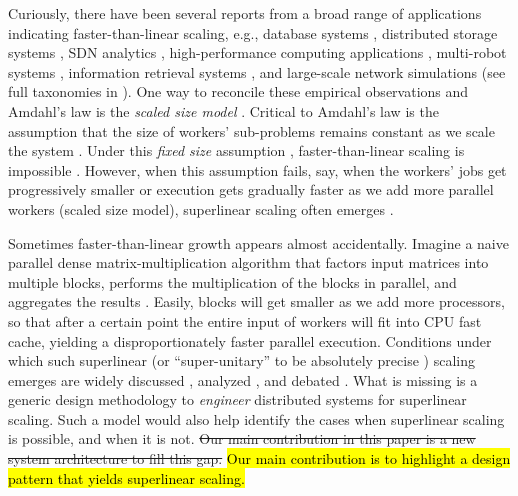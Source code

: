 Curiously, there have been several reports from a broad range of applications indicating faster-than-linear scaling, e.g., database systems \cite{scalability-analyzed, 10.5555/1012889.1012894}, distributed storage systems \cite{271208, dobb-2, icsoft20}, SDN analytics \cite{sdn-analytitcs}, high-performance computing applications \cite{556383, 7733347, 6483679}, multi-robot systems \cite{10.1007/978-3-319-77610-1}, information retrieval systems \cite{dobb-1, dobb-2}, and large-scale network simulations \cite{10.1145/3627703.3629574} (see full taxonomies in \cite{7733347, 80148}). %
One way to reconcile these empirical observations and Amdahl's law is the \emph{scaled size model} \cite{556383}. Critical to Amdahl's law is the assumption that the size of workers' sub-problems remains constant as we scale the system \cite{10.1145/42411.42415}. Under this \emph{fixed size} assumption \cite{556383}, faster-than-linear scaling is impossible \cite{10.1016/0167-8191(86)90024-4}. However, when this assumption fails, say, when the workers' jobs get progressively smaller or execution gets gradually faster as we add more parallel workers (scaled size model), superlinear scaling often emerges \cite{scalability-analyzed, sdn-analytitcs, 6483679, 10.1007/978-3-319-77610-1}.

Sometimes faster-than-linear growth appears almost accidentally. Imagine a naive parallel dense matrix-multiplication algorithm that factors input matrices into multiple blocks, performs the multiplication of the blocks in parallel, and aggregates the results \cite{7733347}. Easily, blocks will get smaller as we add more processors, so that after a certain point the entire input of workers will fit into CPU fast cache, yielding a disproportionately faster parallel execution. Conditions under which such superlinear (or ``super-unitary'' to be absolutely precise \cite{80148}) scaling emerges are widely discussed \cite{556383, dobb-1, dobb-2}, analyzed \cite{80148, 7733347}, and debated \cite{gunther-hotsos, 10.1016/0167-8191(86)90024-4, 10.1145/2773212.2789974}. What is missing is a generic design methodology to \emph{engineer} distributed systems for superlinear scaling. Such a model would also help identify the cases when superlinear scaling is possible, and when it is not. \sout{Our main contribution in this paper is a new system architecture to fill this gap.}
\hl{Our main contribution is to highlight a design pattern that yields superlinear scaling.}

